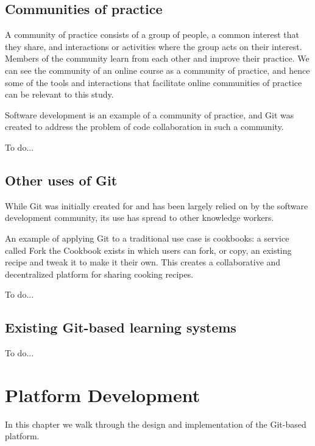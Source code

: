 \documentclass[12pt,twoside,vi]{mitthesis}
\newcommand{\wip}[1]{{\color{red} To do...}}
\begin{document}
\section{Communities of practice}

A community of practice consists of a group of people, a common interest that they share, and interactions or activities where the group acts on their interest. Members of the community learn from each other and improve their practice. We can see the community of an online course as a community of practice, and hence some of the tools and interactions that facilitate online communities of practice can be relevant to this study.~\cite{teachingdigital}

Software development is an example of a community of practice, and Git was created to address the problem of code collaboration in such a community. 

\wip{Use of group chats such as gitter and mattermost to complement projects}

\section{Other uses of Git}

While Git was initially created for and has been largely relied on by the software development community, its use has spread to other knowledge workers.

An example of applying Git to a traditional use case is cookbooks: a service called Fork the Cookbook exists in which users can fork, or copy, an existing recipe and tweak it to make it their own. This creates a collaborative and decentralized platform for sharing cooking recipes.~\cite{forkthecookbook}

\wip{Example applications include recipes, legislation, datasets, general CMS, etc.}

\section{Existing Git-based learning systems}

\wip{look through references}

\chapter{Platform Development}

In this chapter we walk through the design and implementation of the Git-based platform. 
\end{document}

